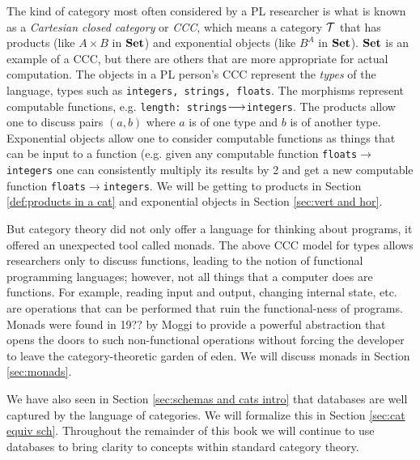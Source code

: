 \documentclass[CT4S-EN-RU]{subfiles}
\begin{document}
\begin{blockRUS}
\end{blockRUS}

\begin{blockENG}
The kind of category most often considered by a PL researcher is what is known as a {\em Cartesian closed category} or {\em CCC}, which means a category $\mathcal{T}$ that has products (like $A\times B$ in ${\bf Set}$) and exponential objects (like $B^A$ in ${\bf Set}$). ${\bf Set}$ is an example of a CCC, but there are others that are more appropriate for actual computation. The objects in a PL person's CCC represent the {\em types} of the language, types such as {\tt integers, strings, floats}. The morphisms represent computable functions, e.g. {\tt length: strings}$\longrightarrow${\tt integers}. The products allow one to discuss pairs $(a,b)$ where $a$ is of one type and $b$ is of another type. Exponential objects allow one to consider computable functions as things that can be input to a function (e.g. given any computable function {\tt floats}$\to${\tt integers} one can consistently multiply its results by 2 and get a new computable function {\tt floats}$\to${\tt integers}. We will be getting to products in Section \ref{def:products in a cat} and exponential objects in Section \ref{sec:vert and hor}. 
\end{blockENG}

\begin{blockRUS}
\end{blockRUS}

\begin{blockENG}
But category theory did not only offer a language for thinking about programs, it offered an unexpected tool called monads. The above CCC model for types allows researchers only to discuss functions, leading to the notion of functional programming languages; however, not all things that a computer does are functions. For example, reading input and output, changing internal state, etc. are operations that can be performed that ruin the functional-ness of programs. Monads were found in 19?? by Moggi \cite{Mog} to provide a powerful abstraction that opens the doors to such non-functional operations without forcing the developer to leave the category-theoretic garden of eden. We will discuss monads in Section \ref{sec:monads}.
\end{blockENG}

\begin{blockRUS}
\end{blockRUS}

\begin{blockENG}
We have also seen in Section \ref{sec:schemas and cats intro} that databases are well captured by the language of categories. We will formalize this in Section \ref{sec:cat equiv sch}. Throughout the remainder of this book we will continue to use databases to bring clarity to concepts within standard category theory. 
\end{blockENG}
\end{document}
